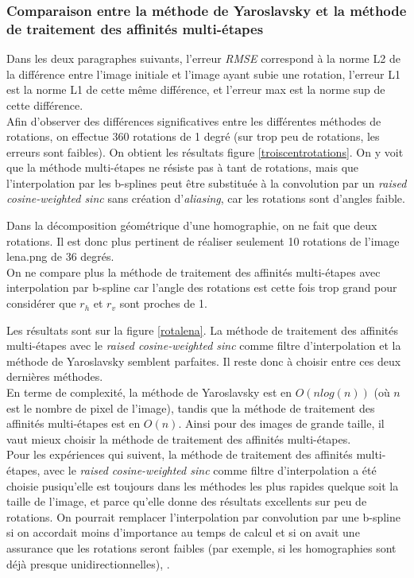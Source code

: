 \subsubsection*{Comparaison entre la méthode de Yaroslavsky et la méthode de traitement des affinités multi-étapes}

	Dans les deux paragraphes suivants, l'erreur \emph{RMSE} correspond à la norme L2 de la différence entre l'image initiale et l'image ayant subie une rotation, l'erreur L1 est la norme L1 de cette même différence, et l'erreur max est la norme sup de cette différence.\\

	Afin d'observer des différences significatives entre les différentes méthodes de rotations, on effectue 360 rotations de 1 degré (sur trop peu de rotations, les erreurs sont faibles). On obtient les résultats figure \ref{troiscentrotations}. On y voit que la méthode multi-étapes ne résiste pas à tant de rotations, mais que l'interpolation par les b-splines peut être substituée à la convolution par un \emph{raised cosine-weighted sinc} sans création d'\emph{aliasing}, car les rotations sont d'angles faible.
\label{pleinsderotations}
	
	Dans la décomposition géométrique d'une homographie, on ne fait que deux rotations. Il est donc plus pertinent de réaliser seulement 10 rotations de l'image lena.png de 36 degrés.\\

	On ne compare plus la méthode de traitement des affinités multi-étapes avec interpolation par b-spline car l'angle des rotations est cette fois trop grand pour considérer que $r_h$ et $r_v$ sont proches de 1.
	
	Les résultats sont sur la figure \ref{rotalena}. La méthode de traitement des affinités multi-étapes avec le \emph{raised cosine-weighted sinc} comme filtre d'interpolation et la méthode de Yaroslavsky semblent parfaites. Il reste donc à choisir entre ces deux dernières méthodes.\\

En terme de complexité, la méthode de Yaroslavsky est en $O(n log(n))$ (où $n$ est le nombre de pixel de l'image), tandis que la méthode de traitement des affinités multi-étapes est en $O(n)$. Ainsi pour des images de grande taille, il vaut mieux choisir la méthode de traitement des affinités multi-étapes.\\

Pour les expériences qui suivent, la méthode de traitement des affinités multi-étapes, avec le \emph{raised cosine-weighted sinc} comme filtre d'interpolation a été choisie pusiqu'elle est toujours dans les méthodes les plus rapides quelque soit la taille de l'image, et parce qu'elle donne des résultats excellents sur peu de rotations. 
On pourrait remplacer l'interpolation par convolution par une b-spline si on accordait moins d'importance au temps de calcul et si on avait une assurance que les rotations seront faibles (par exemple, si les homographies sont déjà presque unidirectionnelles), .

